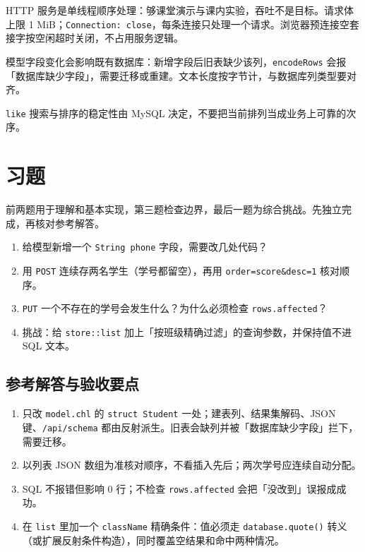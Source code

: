 HTTP 服务是单线程顺序处理：够课堂演示与课内实验，吞吐不是目标。请求体上限 1 MiB；\texttt{Connection:\allowbreak{} close}，每条连接只处理一个请求。浏览器预连接空套接字按空闲超时关闭，不占用服务逻辑。

模型字段变化会影响既有数据库：新增字段后旧表缺少该列，\texttt{encode\allowbreak{}Rows} 会报「数据库缺少字段」，需要迁移或重建。文本长度按字节计，与数据库列类型要对齐。

\texttt{like} 搜索与排序的稳定性由 MySQL 决定，不要把当前排列当成业务上可靠的次序。

\section{习题}

前两题用于理解和基本实现，第三题检查边界，最后一题为综合挑战。先独立完成，再核对参考解答。

\begin{enumerate}

\item 给模型新增一个 \texttt{String phone} 字段，需要改几处代码？

\item 用 \texttt{POST} 连续存两名学生（学号都留空），再用 \texttt{order=\allowbreak{}score\&desc=\allowbreak{}1} 核对顺序。

\item \texttt{PUT} 一个不存在的学号会发生什么？为什么必须检查 \texttt{rows.\allowbreak{}affected}？

\item 挑战：给 \texttt{store:\allowbreak{}:\allowbreak{}list} 加上「按班级精确过滤」的查询参数，并保持值不进 SQL 文本。

\end{enumerate}

\subsection*{参考解答与验收要点}

\begin{enumerate}

\item 只改 \texttt{model.\allowbreak{}chl} 的 \texttt{struct Student} 一处；建表列、结果集解码、JSON 键、\texttt{/\allowbreak{}api/\allowbreak{}schema} 都由反射派生。旧表会缺列并被「数据库缺少字段」拦下，需要迁移。

\item 以列表 JSON 数组为准核对顺序，不看插入先后；两次学号应连续自动分配。

\item SQL 不报错但影响 0 行；不检查 \texttt{rows.\allowbreak{}affected} 会把「没改到」误报成成功。

\item 在 \texttt{list} 里加一个 \texttt{class\allowbreak{}Name} 精确条件：值必须走 \texttt{database.\allowbreak{}quote(\allowbreak{})\allowbreak{}} 转义（或扩展反射条件构造），同时覆盖空结果和命中两种情况。

\end{enumerate}

